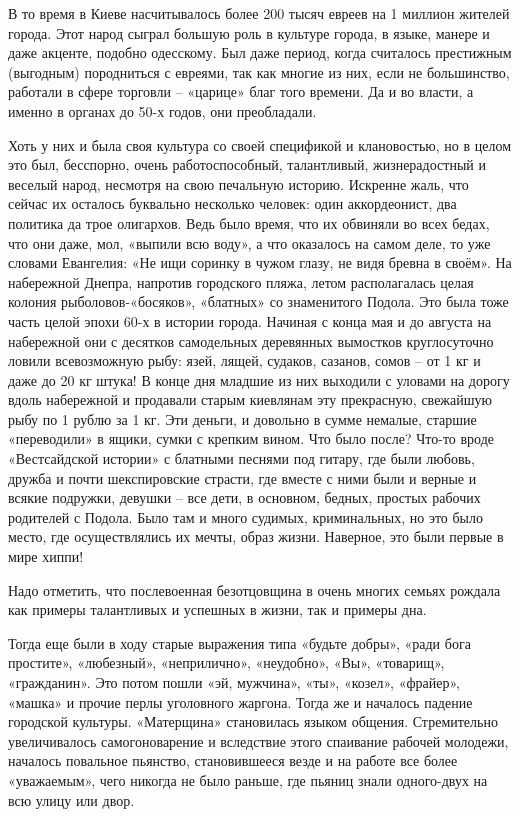В то время в Киеве насчитывалось более 200 тысяч евреев на 1 миллион жителей
города. Этот народ сыграл большую роль в культуре города, в языке, манере и
даже акценте, подобно одесскому. Был даже период, когда считалось престижным
(выгодным) породниться с евреями, так как многие из них, если не большинство,
работали в сфере торговли – «царице» благ того времени. Да и во власти, а
именно в органах до 50-х годов, они преобладали. 

Хоть у них и была своя культура со своей спецификой и клановостью, но в целом
это был, бесспорно, очень работоспособный, талантливый, жизнерадостный и
веселый народ, несмотря на свою печальную историю. Искренне жаль, что сейчас их
осталось буквально несколько человек: один аккордеонист, два политика да трое
олигархов. Ведь было время, что их обвиняли во всех бедах, что они даже, мол,
«выпили всю воду», а что оказалось на самом деле, то уже словами Евангелия: «Не
ищи соринку в чужом глазу, не видя бревна в своём».  На набережной Днепра,
напротив городского пляжа, летом располагалась целая колония
рыболовов-«босяков», «блатных» со знаменитого Подола. Это была тоже часть целой
эпохи 60-х в истории города. Начиная с конца мая и до августа на набережной они
с десятков самодельных деревянных вымостков круглосуточно ловили всевозможную
рыбу: язей, лящей, судаков, сазанов, сомов – от 1 кг и даже до 20 кг штука! В
конце дня младшие из них выходили с уловами на дорогу вдоль набережной и
продавали старым киевлянам эту прекрасную, свежайшую рыбу по 1 рублю за 1 кг.
Эти деньги, и довольно в сумме немалые, старшие «переводили» в ящики, сумки с
крепким вином. Что было после? Что-то вроде «Вестсайдской истории» с блатными
песнями под гитару, где были любовь, дружба и почти шекспировские страсти, где
вместе с ними были и верные и всякие подружки, девушки – все дети, в основном,
бедных, простых рабочих родителей с Подола. Было там и много судимых,
криминальных, но это было место, где осуществлялись их мечты, образ жизни.
Наверное, это были первые в мире хиппи! 

Надо отметить, что послевоенная безотцовщина в очень многих семьях рождала как
примеры талантливых и успешных в жизни, так и примеры дна.

Тогда еще были в ходу старые выражения типа «будьте добры», «ради бога
простите», «любезный», «неприлично», «неудобно», «Вы», «товарищ», «гражданин».
Это потом пошли «эй, мужчина», «ты», «козел», «фрайер», «машка» и прочие перлы
уголовного жаргона. Тогда же и началось падение городской культуры. «Матерщина»
становилась языком общения. Стремительно увеличивалось самогоноварение и
вследствие этого спаивание рабочей молодежи, началось повальное пьянство,
становившееся везде и на работе все более «уважаемым», чего никогда не было
раньше, где пьяниц знали одного-двух на всю улицу или двор. 

